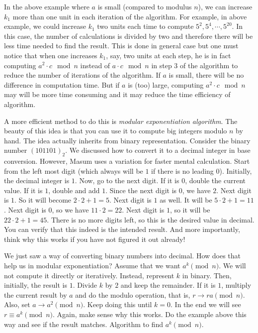 \documentclass{subfile}
\begin{document}
	\begin{remark}
		In the above example where $a$ is small (compared to modulus $n$), we can increase $k_1$ more than one unit in each iteration of the algorithm. For example, in above example, we could increase $k_1$ two units each time to compute $5^2, 5^4,\cdots, 5^{20}$. In this case, the number of calculations is divided by two and therefore there will be less time needed to find the result. This is done in general case but one must notice that when one increases $k_1$, say, two units at each step, he is in fact computing $a^2 \cdot c \mod n$ instead of $a \cdot c \mod n$ in step $3$ of the algorithm to reduce the number of iterations of the algorithm. If $a$ is small, there will be no difference in computation time. But if $a$ is (too) large, computing $a^2 \cdot c \mod n$ may will be more time consuming and it may reduce the time efficiency of algorithm.
	\end{remark}
	
	A more efficient method to do this is \textit{modular exponentiation algorithm}. The beauty of this idea is that you can use it to compute big integers modulo $n$ by hand. The idea actually inherits from binary representation. Consider the binary number $(101101)_2$. We discussed how to convert it to a decimal integer in base conversion. However, Masum uses a variation for faster mental calculation. Start from the left most digit (which always will be $1$ if there is no leading $0$). Initially, the decimal integer is $1$. Now, go to the next digit. If it is $0$, double the current value. If it is $1$, double and add $1$. Since the next digit is $0$, we have $2$. Next digit is $1$. So it will become $2\cdot2+1=5$. Next digit is $1$ as well. It will be $5\cdot2+1=11$. Next digit is $0$, so we have $11\cdot2=22$. Next digit is $1$, so it will be $22\cdot2+1=45$. There is no more digits left, so this is the desired value in decimal. You can verify that this indeed is the intended result. And more importantly, think why this works if you have not figured it out already!
	
	We just saw a way of converting binary numbers into decimal. How does that help us in modular exponentiation? Assume that we want $a^k\pmod n$. We will not compute it directly or iteratively. Instead, represent $k$ in binary. Then, initially, the result is $1$. Divide $k$ by $2$ and keep the remainder. If it is $1$, multiply the current result by $a$ and do the modulo operation, that is, $r\to ra\pmod n$. Also, set $a\to a^2\pmod n$. Keep doing this until $k=0$. In the end we will see $r\equiv a^k\pmod n$. Again, make sense why this works. Do the example above this way and see if the result matches. Algorithm to find $a^k\pmod n$.
\end{document}

